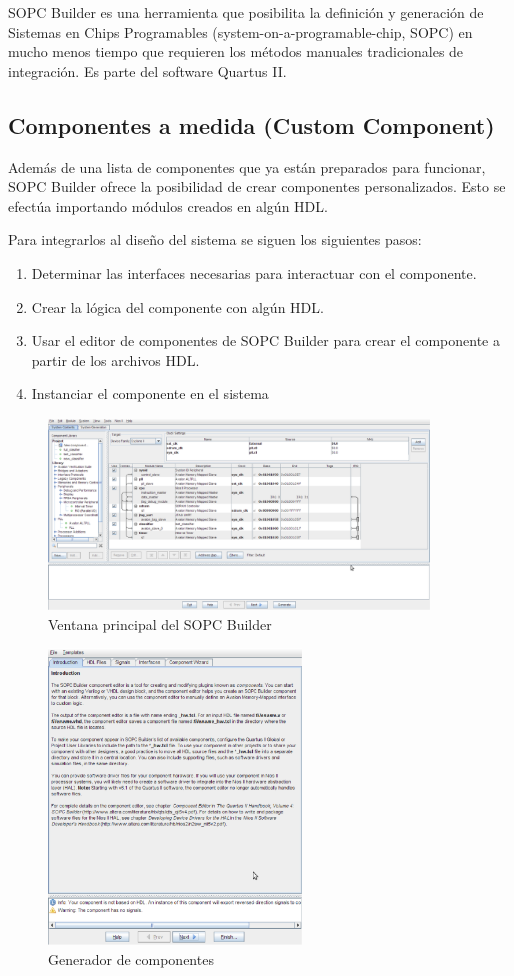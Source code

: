 SOPC Builder es una herramienta que posibilita la definición y generación de Sistemas en Chips Programables (system-on-a-programable-chip, SOPC) en mucho menos tiempo que requieren los métodos manuales tradicionales de integración. Es parte del software Quartus II.

\subsection*{Componentes a medida (Custom Component)}

Además de una lista de componentes que ya están preparados para funcionar, SOPC Builder ofrece la posibilidad de crear componentes personalizados. Esto se efectúa importando módulos creados en algún HDL.

 Para integrarlos al diseño del sistema se siguen los siguientes pasos:
\begin{enumerate}
	\item Determinar las interfaces necesarias para interactuar con el componente.
	\item Crear la lógica del componente con algún HDL.
	\item Usar el editor de componentes de SOPC Builder para crear el componente a partir de los archivos HDL.
	\item Instanciar el componente en el sistema 
\end{enumerate}

\begin{figure}[H]
  \centering
	\includegraphics[width=0.90\textwidth]{8-apendices/graf/sopc1.eps}
  \caption{Ventana principal del SOPC Builder}
  \label{fig:sopc1}
\end{figure}

\begin{figure}[H]
  \centering
	\includegraphics[width=0.60\textwidth]{8-apendices/graf/sopc2.eps}
  \caption{Generador de componentes}
  \label{fig:sopc2}
\end{figure}
